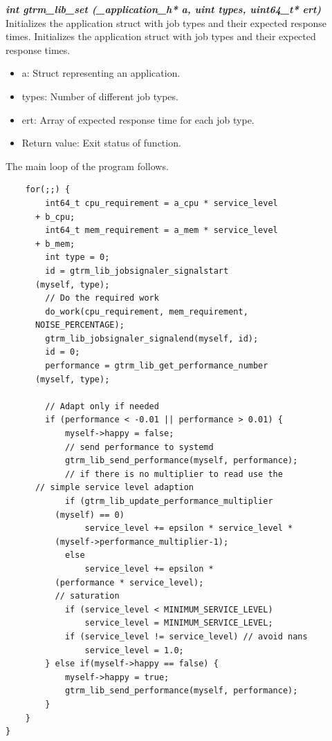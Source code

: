 \documentclass[nobiblatex]{LTHthesis}
\begin{document}
\begin{framed}
	\begin{flushleft}		
		\emph{\textbf{{int gtrm\_lib\_set
    (\_application\_h* a, uint types, uint64\_t* ert)}}} \newline
		Initializes the application struct with job types and their 
    expected response times.
		Initializes the application struct with job types and their expected response times.
		\begin{itemize}
		  \item a: Struct representing an application.
		  \item types: Number of different job types.
		  \item ert: Array of expected response time for each job type.
		  \item Return value: Exit status of function.
    \end{itemize}
  \end{flushleft}
\end{framed}

The main loop of the program follows.

\begin{lstlisting}
	for(;;) {		
		int64_t cpu_requirement = a_cpu * service_level 
      + b_cpu;
		int64_t mem_requirement = a_mem * service_level 
      + b_mem;
		int type = 0;
		id = gtrm_lib_jobsignaler_signalstart
      (myself, type);		
		// Do the required work	
		do_work(cpu_requirement, mem_requirement, 
      NOISE_PERCENTAGE);	
		gtrm_lib_jobsignaler_signalend(myself, id);
		id = 0;										
		performance = gtrm_lib_get_performance_number
      (myself, type);
		
		// Adapt only if needed
		if (performance < -0.01 || performance > 0.01) {
			myself->happy = false;					
			// send performance to systemd
			gtrm_lib_send_performance(myself, performance);					
			// if there is no multiplier to read use the 
      // simple service level adaption
			if (gtrm_lib_update_performance_multiplier
          (myself) == 0)
				service_level += epsilon * service_level *
          (myself->performance_multiplier-1);
			else
				service_level += epsilon * 
          (performance * service_level);	
		  // saturation											
			if (service_level < MINIMUM_SERVICE_LEVEL)
				service_level = MINIMUM_SERVICE_LEVEL;
			if (service_level != service_level) // avoid nans
				service_level = 1.0;
		} else if(myself->happy == false) {			
			myself->happy = true;
			gtrm_lib_send_performance(myself, performance);
		}	
	}	
}
\end{lstlisting}
\end{document}
